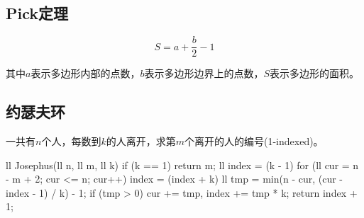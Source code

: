 \subsection{Pick定理}
\[ S=a+\frac{b}{2}-1 \]

其中$a$表示多边形内部的点数，$b$表示多边形边界上的点数，$S$表示多边形的面积。

\subsection{约瑟夫环}
一共有$n$个人，每数到$k$的人离开，求第$m$个离开的人的编号(1-indexed)。
\begin{cpplist}
ll Josephus(ll n, ll m, ll k) {
  if (k == 1) return m;
  ll index = (k - 1) %
  for (ll cur = n - m + 2; cur <= n; cur++) {
    index = (index + k) %
    ll tmp = min(n - cur, (cur - index - 1) / k) - 1;
    if (tmp > 0) cur += tmp, index += tmp * k;
  }
  return index + 1;
}
\end{cpplist}